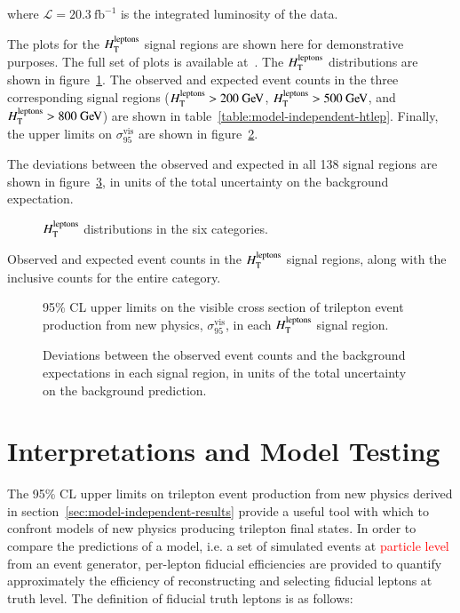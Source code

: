 where $\mathcal{L}=20.3~\mbox{fb}^{-1}$ is the integrated luminosity of the data.

The plots for the $H_{\mathrm{T}}^{\mathrm{leptons}}$ signal regions are shown here for demonstrative purposes. The full set of plots is available at~\cite{model-independent-webpage}. The $H_{\mathrm{T}}^{\mathrm{leptons}}$ distributions are shown in figure~\ref{fig:model-independent-htlep}. The observed and expected event counts in the three corresponding signal regions ($\htlep>200 \GeV$, $\htlep>500 \GeV$, and $\htlep>800 \GeV$) are shown in table~\ref{table:model-independent-htlep}. Finally, the upper limits on $\sigma_{95}^{\mathrm{vis}}$ are shown in figure~\ref{fig:model-independent-htlep-sigmavis}. 

The deviations between the observed and expected in all 138 signal regions are shown in figure~\ref{fig:model-independent-summary-sigma}, in units of the total uncertainty on the background expectation. 

\begin{figure}[htbp]
	\centering

	\caption{$H_{\mathrm{T}}^{\mathrm{leptons}}$ distributions in the six categories.}
	\label{fig:model-independent-htlep}
\end{figure}

\begin{table}[htbp]
	\centering

	\caption{Observed and expected event counts in the $H_{\mathrm{T}}^{\mathrm{leptons}}$ signal regions, along with the inclusive counts for the entire category.}
	\label{table:model-independent-htlep}
\end{table}

\begin{figure}
	\centering

	\caption{95\% CL upper limits on the visible cross section of trilepton event production from new physics, $\sigma_{95}^{\mathrm{vis}}$, in each $H_{\mathrm{T}}^{\mathrm{leptons}}$ signal region. }
	\label{fig:model-independent-htlep-sigmavis}
\end{figure}

\begin{figure}
	\centering

	\caption{Deviations between the observed event counts and the background expectations in each signal region, in units of the total uncertainty on the background prediction.}
	\label{fig:model-independent-summary-sigma}
\end{figure}



\section{Interpretations and Model Testing}
The 95\% CL upper limits on trilepton event production from new physics derived in section~\ref{sec:model-independent-results} provide a useful tool with which to confront models of new physics producing trilepton final states. In order to compare the predictions of a model, i.e. a set of simulated events at \textcolor{red}{particle level} from an event generator, per-lepton fiducial efficiencies are provided to quantify approximately the efficiency of reconstructing and selecting fiducial leptons at truth level. The definition of fiducial truth leptons is as follows: 

